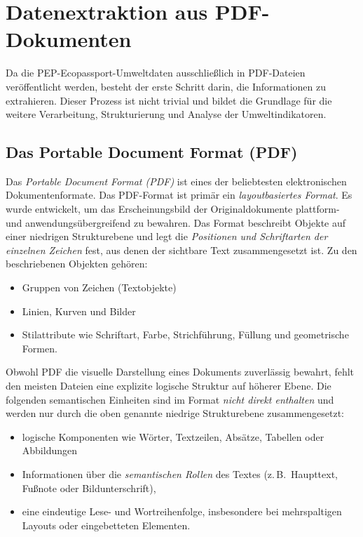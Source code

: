 \section{Datenextraktion aus PDF-Dokumenten}
Da die PEP-Ecopassport-Umweltdaten ausschließlich in PDF-Dateien veröffentlicht werden, 
besteht der erste Schritt darin, die Informationen zu extrahieren. 
Dieser Prozess ist nicht trivial und bildet die Grundlage für die weitere Verarbeitung,
Strukturierung und Analyse der Umweltindikatoren. 


\subsection{Das Portable Document Format (PDF)}

Das \emph{Portable Document Format (PDF)} ist eines der beliebtesten elektronischen Dokumentenformate.  
Das PDF-Format ist primär ein \emph{layoutbasiertes Format}. 
Es wurde entwickelt, um das Erscheinungsbild der Originaldokumente plattform- und anwendungsübergreifend zu bewahren. \cite{Lovegrove1995}
Das Format beschreibt Objekte auf einer niedrigen Strukturebene und legt die \emph{Positionen und Schriftarten der einzelnen Zeichen} fest, aus
denen der sichtbare Text zusammengesetzt ist. 
Zu den beschriebenen Objekten gehören:
\begin{itemize}
    \item Gruppen von Zeichen (Textobjekte)
    \item Linien, Kurven und Bilder
    \item Stilattribute wie Schriftart, Farbe, Strichführung, Füllung und geometrische Formen.
\end{itemize}
\cite{Bast2017}

Obwohl PDF die visuelle Darstellung eines Dokuments zuverlässig bewahrt, fehlt den meisten Dateien eine explizite 
logische Struktur auf höherer Ebene. 
Die folgenden semantischen Einheiten sind im Format \emph{nicht direkt enthalten} und werden nur 
durch die oben genannte niedrige Strukturebene zusammengesetzt:
\begin{itemize}
    \item logische Komponenten wie Wörter, Textzeilen, Absätze, Tabellen oder Abbildungen \cite{Chao2004}
    \item Informationen über die \emph{semantischen Rollen} des Textes (z.\,B.\ Haupttext, Fußnote oder Bildunterschrift), \cite{Bast2017}
    \item eine eindeutige Lese- und Wortreihenfolge, insbesondere bei mehrspaltigen Layouts oder eingebetteten Elementen. \cite{Bast2017}
\end{itemize}

